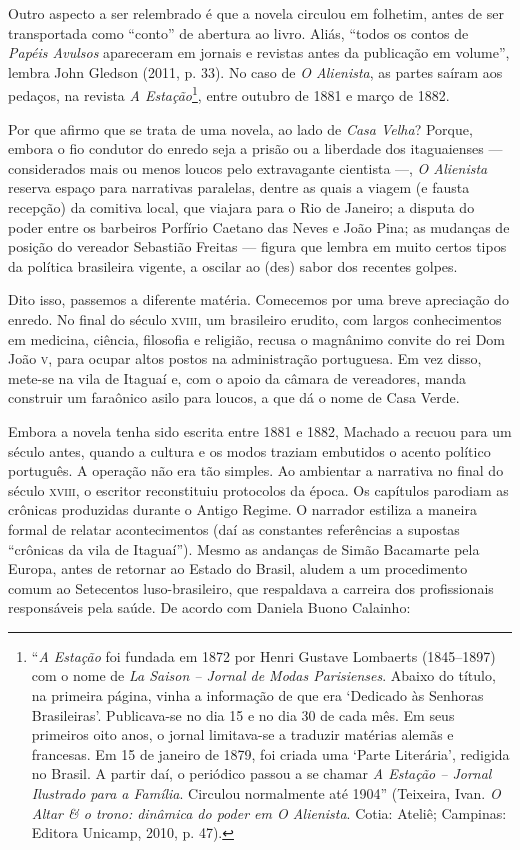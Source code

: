 Outro aspecto a ser relembrado é que a novela circulou em folhetim,
antes de ser transportada como ``conto'' de abertura ao livro. Aliás,
``todos os contos de \emph{Papéis Avulsos} apareceram em jornais e
revistas antes da publicação em volume'', lembra John Gledson (2011, p.
33). No caso de \emph{O Alienista}, as partes saíram aos pedaços, na
revista \emph{A Estação}\footnote{``\emph{A Estação} foi fundada em 1872
  por Henri Gustave Lombaerts (1845--1897) com o nome de \emph{La Saison
  -- Jornal de Modas Parisienses}. Abaixo do título, na primeira página,
  vinha a informação de que era `Dedicado às Senhoras Brasileiras'.
  Publicava-se no dia 15 e no dia 30 de cada mês. Em seus primeiros oito
  anos, o jornal limitava-se a traduzir matérias alemãs e francesas. Em
  15 de janeiro de 1879, foi criada uma `Parte Literária', redigida no
  Brasil. A partir daí, o periódico passou a se chamar \emph{A Estação
  -- Jornal Ilustrado para a Família}. Circulou normalmente até 1904''
  (Teixeira, Ivan. \emph{O Altar \& o trono: dinâmica do poder em O
  Alienista}. Cotia: Ateliê; Campinas: Editora Unicamp, 2010, p. 47).},
entre outubro de 1881 e março de 1882.

Por que afirmo que se trata de uma novela, ao lado de \emph{Casa Velha}?
Porque, embora o fio condutor do enredo seja a prisão ou a liberdade dos
itaguaienses --- considerados mais ou menos loucos pelo extravagante
cientista ---, \emph{O Alienista} reserva espaço para narrativas
paralelas, dentre as quais a viagem (e fausta recepção) da comitiva
local, que viajara para o Rio de Janeiro; a disputa do poder entre os
barbeiros Porfírio Caetano das Neves e João Pina; as mudanças de posição
do vereador Sebastião Freitas --- figura que lembra em muito certos tipos
da política brasileira vigente, a oscilar ao (des) sabor dos recentes
golpes.

Dito isso, passemos a diferente matéria. Comecemos por uma breve
apreciação do enredo. No final do século \textsc{xviii}, um brasileiro erudito,
com largos conhecimentos em medicina, ciência, filosofia e religião,
recusa o magnânimo convite do rei Dom João \textsc{v}, para ocupar altos postos
na administração portuguesa. Em vez disso, mete-se na vila de Itaguaí e,
com o apoio da câmara de vereadores, manda construir um faraônico asilo
para loucos, a que dá o nome de Casa Verde.

Embora a novela tenha sido escrita entre 1881 e 1882, Machado a recuou
para um século antes, quando a cultura e os modos traziam embutidos o
acento político português. A operação não era tão simples. Ao ambientar
a narrativa no final do século \textsc{xviii}, o escritor reconstituiu protocolos
da época. Os capítulos parodiam as crônicas produzidas durante o Antigo
Regime. O narrador estiliza a maneira formal de relatar acontecimentos
(daí as constantes referências a supostas ``crônicas da vila de
Itaguaí''). Mesmo as andanças de Simão Bacamarte pela Europa, antes de
retornar ao Estado do Brasil, aludem a um procedimento comum ao
Setecentos luso-brasileiro, que respaldava a carreira dos profissionais
responsáveis pela saúde. De acordo com Daniela Buono Calainho:

